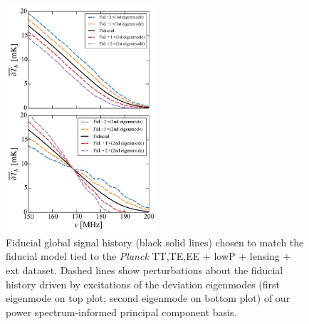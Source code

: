 \documentclass[twocolumn,aps,prd,nofootinbib,showpacs]{revtex4-1}
\begin{document}
\begin{figure}[!]
\centering
\includegraphics[width=0.5\textwidth]{figures/devEigenmodes.pdf}
\caption{Fiducial global signal history (black solid lines) chosen to match the fiducial model tied to the \emph{Planck} TT,TE,EE + lowP + lensing + ext dataset. Dashed lines show perturbations about the fiducial history driven by excitations of the deviation eigenmodes (first eigenmode on top plot; second eigenmode on bottom plot) of our power spectrum-informed principal component basis.}
\label{fig:devEigenmodes}
\end{figure}
\end{document}
